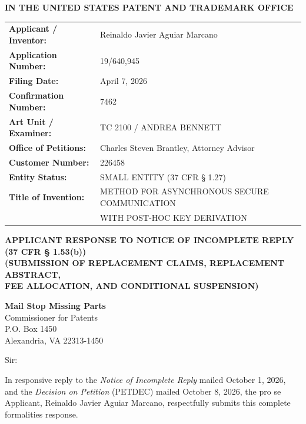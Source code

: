 \documentclass[11pt,letterpaper]{article}
\begin{document}
\thispagestyle{empty}

\begin{center}
    \textbf{\large IN THE UNITED STATES PATENT AND TRADEMARK OFFICE}
\end{center}

\vspace{0.3cm}
\noindent\begin{tabular}{p{2.3in}p{4.0in}}
\textbf{Applicant / Inventor:} & Reinaldo Javier Aguiar Marcano \\
\textbf{Application Number:} & 19/640,945 \\
\textbf{Filing Date:} & April 7, 2026 \\
\textbf{Confirmation Number:} & 7462 \\
\textbf{Art Unit / Examiner:} & TC 2100 / ANDREA BENNETT \\
\textbf{Office of Petitions:} & Charles Steven Brantley, Attorney Advisor \\
\textbf{Customer Number:} & 226458 \\
\textbf{Entity Status:} & SMALL ENTITY (37 CFR \S{} 1.27) \\
\textbf{Title of Invention:} & METHOD FOR ASYNCHRONOUS SECURE COMMUNICATION \\
& WITH POST-HOC KEY DERIVATION \\
\end{tabular}

\vspace{0.4cm}
\begin{center}
    \textbf{\large APPLICANT RESPONSE TO NOTICE OF INCOMPLETE REPLY \\
    (37 CFR \S{} 1.53(b))} \\
    \textbf{\normalsize (SUBMISSION OF REPLACEMENT CLAIMS, REPLACEMENT ABSTRACT, \\
    FEE ALLOCATION, AND CONDITIONAL SUSPENSION)}
\end{center}

\noindent\textbf{Mail Stop Missing Parts} \\
Commissioner for Patents \\
P.O. Box 1450 \\
Alexandria, VA 22313-1450

\vspace{0.2cm}
Sir:

In responsive reply to the \textit{Notice of Incomplete Reply} mailed October 1, 2026, and the \textit{Decision on Petition} (PETDEC) mailed October 8, 2026, the pro se Applicant, Reinaldo Javier Aguiar Marcano, respectfully submits this complete formalities response.
\end{document}
